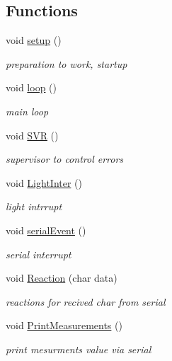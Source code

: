 \subsection*{Functions}
\begin{DoxyCompactItemize}
\item 
\mbox{\label{_arduino_8ino_a4fc01d736fe50cf5b977f755b675f11d}} 
void \hyperlink{_arduino_8ino_a4fc01d736fe50cf5b977f755b675f11d}{setup} ()
\begin{DoxyCompactList}\small\item\em preparation to work, startup \end{DoxyCompactList}\item 
\mbox{\label{_arduino_8ino_afe461d27b9c48d5921c00d521181f12f}} 
void \hyperlink{_arduino_8ino_afe461d27b9c48d5921c00d521181f12f}{loop} ()
\begin{DoxyCompactList}\small\item\em main loop \end{DoxyCompactList}\item 
\mbox{\label{_arduino_8ino_ab68e0fadbdf08bac0bac225684590691}} 
void \hyperlink{_arduino_8ino_ab68e0fadbdf08bac0bac225684590691}{S\+VR} ()
\begin{DoxyCompactList}\small\item\em supervisor to control errors \end{DoxyCompactList}\item 
\mbox{\label{_arduino_8ino_a0fa4431e3bcdb9b59211aa7b7cb0c913}} 
void \hyperlink{_arduino_8ino_a0fa4431e3bcdb9b59211aa7b7cb0c913}{Light\+Inter} ()
\begin{DoxyCompactList}\small\item\em light intrrupt \end{DoxyCompactList}\item 
\mbox{\label{_arduino_8ino_aa11606a63bbe57842b51321e714a8daf}} 
void \hyperlink{_arduino_8ino_aa11606a63bbe57842b51321e714a8daf}{serial\+Event} ()
\begin{DoxyCompactList}\small\item\em serial interrupt \end{DoxyCompactList}\item 
void \hyperlink{_arduino_8ino_a3640ee72ee61eaba275b032cfce4f023}{Reaction} (char data)
\begin{DoxyCompactList}\small\item\em reactions for recived char from serial \end{DoxyCompactList}\item 
\mbox{\label{_arduino_8ino_a6d27cb0438359d299b4e536208457cc9}} 
void \hyperlink{_arduino_8ino_a6d27cb0438359d299b4e536208457cc9}{Print\+Measurements} ()
\begin{DoxyCompactList}\small\item\em print mesurments value via serial \end{DoxyCompactList}\end{DoxyCompactItemize}
